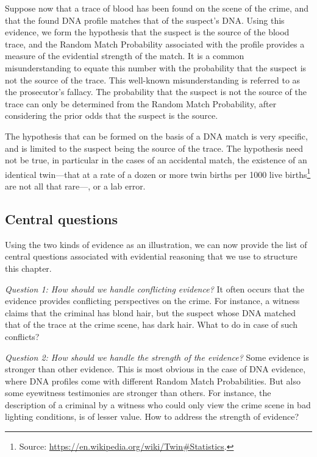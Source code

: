 \documentclass[10pt]{article}
\begin{document}
Suppose now that a trace of blood has been found on the scene of the crime, and that the found DNA profile matches that of the suspect's DNA. Using this evidence, we form the hypothesis that the suspect is the source of the blood trace, and the Random Match Probability associated with the profile provides a measure of the evidential strength of the match. It is a common misunderstanding to equate this number with the probability that the suspect is not the source of the trace. This well-known misunderstanding is referred to as the prosecutor's fallacy. The probability that the suspect is not the source of the trace can only be determined from the Random Match Probability, after considering the prior odds that the suspect is the source. 

The hypothesis that can be formed on the basis of a DNA match is very specific, and is limited to the suspect being the source of the trace. The hypothesis need not be true, in particular in the cases of an accidental match, the existence of an identical twin---that at a rate of a dozen or more twin births per 1000 live births\footnote{Source: 
\url{https://en.wikipedia.org/wiki/Twin\#Statistics}.} are not all that rare---, or a lab error. 

\subsection{Central questions}

Using the two kinds of evidence as an illustration, we can now provide the list of central questions associated 
with evidential reasoning that we use to structure this chapter.

\textit{Question 1:	How should we handle conflicting evidence?}
It often occurs that the evidence provides conflicting perspectives on the crime. For instance, a witness claims that the criminal has blond hair, but the suspect whose DNA matched that of the trace at the crime scene, has dark hair. What to do in case of such conflicts? 

\textit{Question 2:	How should we handle the strength of the evidence?}
Some evidence is stronger than other evidence. This is most obvious in the case of DNA evidence, where DNA profiles come with different Random Match Probabilities. But also some eyewitness testimonies are stronger than others. For instance, the description of a criminal by a witness who could only view the crime scene in bad lighting conditions, is of lesser value. How to address the strength of evidence?
\end{document}
